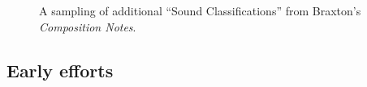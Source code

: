         \begin{figure}
        \centering
        \captionsetup{width=.5\textwidth}
        \caption[A sampling of additional ``Sound Classifications'' from Braxton's \textit{Composition Notes}.]{A sampling of additional ``Sound Classifications'' from Braxton's \textit{Composition Notes}.\footnotemark}
        \label{fig:soundclassifications}
    \end{figure}


    \subsection{Early efforts}

